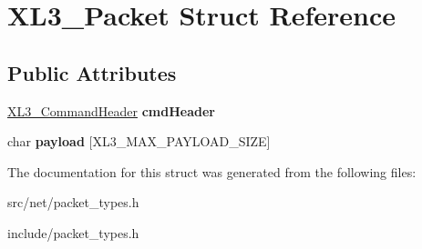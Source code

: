 \hypertarget{structXL3__Packet}{
\section{XL3\_\-Packet Struct Reference}
\label{structXL3__Packet}
}
\subsection*{Public Attributes}
\begin{DoxyCompactItemize}
\item 
\hypertarget{structXL3__Packet_a65cb74085fe17071dc58227b163bb88b}{
\hyperlink{structXL3__CommandHeader}{XL3\_\-CommandHeader} {\bfseries cmdHeader}}
\label{structXL3__Packet_a65cb74085fe17071dc58227b163bb88b}

\item 
\hypertarget{structXL3__Packet_a970e9b23c0c8ac7b2f54f3a8c23f9605}{
char {\bfseries payload} \mbox{[}XL3\_\-MAX\_\-PAYLOAD\_\-SIZE\mbox{]}}
\label{structXL3__Packet_a970e9b23c0c8ac7b2f54f3a8c23f9605}

\end{DoxyCompactItemize}


The documentation for this struct was generated from the following files:\begin{DoxyCompactItemize}
\item 
src/net/packet\_\-types.h\item 
include/packet\_\-types.h\end{DoxyCompactItemize}
